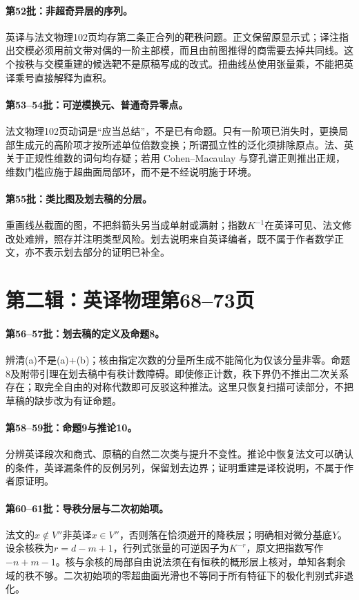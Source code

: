 \documentclass[UTF8,a4paper]{ctexbook}
\begin{document}
\paragraph{第52批：非超奇异层的序列。}
英译与法文物理102页均存第二条正合列的靶秩问题。正文保留原显示式；译注指出交模必须用前文带对偶的一阶主部模，而且由前图推得的商需要去掉共同线。这个按秩与交模重建的候选靶不是原稿写成的改式。扭曲线丛使用张量乘，不能把英译乘号直接解释为直积。
\paragraph{第53--54批：可逆模换元、普通奇异零点。}
法文物理102页动词是“应当总结”，不是已有命题。只有一阶项已消失时，更换局部生成元的高阶项才按所述单位倍数变换；所谓孤立性的泛化须排除原点。法、英关于正规性维数的词句均存疑；若用 Cohen--Macaulay 与穿孔谱正则推出正规，维数门槛应施于超曲面局部环，而不是不经说明施于环境。
\paragraph{第55批：类比图及划去稿的分层。}
重画线丛截面的图，不把斜箭头另当成单射或满射；指数$K^{-1}$在英译可见、法文修改处难辨，照存并注明类型风险。划去说明来自英译编者，既不属于作者数学正文，亦不表示划去部分的证明已补全。
\section*{第二辑：英译物理第68--73页}
\paragraph{第56--57批：划去稿的定义及命题8。}
辨清(a)不是(a)+(b)；核由指定次数的分量所生成不能简化为仅该分量非零。命题8及附带引理在划去稿中有秩计数障碍。即使修正计数，秩下界仍不推出二次关系存在；取完全自由的对称代数即可反驳这种推法。这里只恢复扫描可读部分，不把草稿的缺步改为有证命题。
\paragraph{第58--59批：命题9与推论10。}
分辨英译段次和商式、原稿的自然二次类与提升不变性。推论中恢复法文可以确认的条件，英译漏条件的反例另列，保留划去边界；证明重建是译校说明，不属于作者原证明。
\paragraph{第60--61批：导秩分层与二次初始项。}
法文的$x\notin V''$非英译$x\in V''$，否则落在恰须避开的降秩层；明确相对微分基底$Y$。设余核秩为$r=d-m+1$，行列式张量的可逆因子为$K^{-r}$，原文把指数写作$-n+m-1$。核与余核的局部自由说法须在有恒秩的概形层上核对，单知各剩余域的秩不够。二次初始项的零超曲面光滑也不等同于所有特征下的极化判别式非退化。
\end{document}
